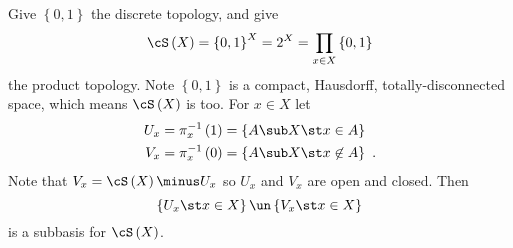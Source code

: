 Give $\left\{0,1\right\}$ the discrete topology, and give 
\begin{equation*}
\cS\left(X\right) =
\left\{0,1\right\}^X = 2^X = \prod_{x\in X} \left\{0,1\right\}
\end{equation*}
the product topology. Note $\left\{0,1\right\}$ is a compact, Hausdorff,
totally-disconnected space, which means $\cS\left(X\right)$ is too.
For $x\in X$ let 
\begin{align*}
U_x &= \pi_x^{-1}\left(1\right) = \left\{A\sub X \st x\in A\right\} \\
V_x &= \pi_x^{-1}\left(0\right) = \left\{A\sub X \st x\not\in A\right\} \ .
\end{align*}
Note that $V_x = \cS\left(X\right)\minus U_x$ so $U_x$ and $V_x$ are open and closed.
Then
\begin{equation}
\left\{U_x \st x\in X\right\}\un \left\{V_x \st x\in X\right\}
\end{equation}
is a subbasis for $\cS\left(X\right)$.


